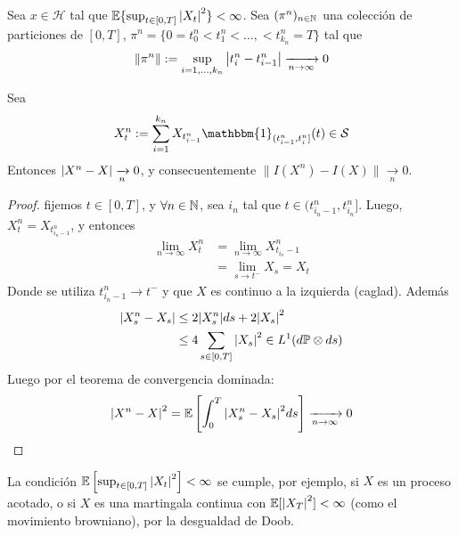 \begin{proposition}
        Sea $x \in \mathcal{H}$ tal que $\mathbb{E}\{ \sup_{t \in [0,T]} \abs{X_t}^2 \} < \infty$. Sea 
        $(\pi^n)_{n \in \mathbb{N}}$ una colección de particiones de $[0,T]$, $\pi^{n} = \{ 0= t_0^{n}< 
        t_{1}^n< \ldots, < t_{k_n}^{n} = T\}$ tal que 
        \begin{equation*}
                \|\pi^n\| := \sup_{i = 1, \ldots, k_n} \abs{t_i^n -
                t_{i-1}^{n}} \xrightarrow[n \to \infty]{} 0
        \end{equation*}

        Sea
        \begin{equation*}
                X_t^n := \sum_{i=1}^{k_n} X_{t_{i-1}^n} \mathbbm{1}_{(t_{i-1}^n, t_{i}^{n}]}(t) \in \mathcal{S}
        \end{equation*}
        Entonces $\abs{X^n - X} \xrightarrow[n]{} 0$, y consecuentemente
        $\|I(X^n) - I(X)\| \xrightarrow[n]{} 0$.
\end{proposition}
\begin{proof}
\gris
    fijemos $t \in [0,T]$, y $\forall n \in \mathbb{N}$, sea $i_n$ tal que $t \in (t_{i_n -1}^n, t_{i_n}^n]$. 
    Luego, $X_{t}^{n} = X_{t_{i_n -1}^n}$, y entonces 
    \begin{align*}
            \lim_{n \to \infty} X_{t}^{n} 
            &= \lim_{n \to \infty} X_{t_{i_n} - 1}^n \\
            &= \lim_{s \to t^{-}} X_s = X_t 
    \end{align*}
    Donde se utiliza $t_{i_n - 1}^n \to t^{-}$ y que $X$ es continuo a la izquierda (caglad). Además 
    \begin{align*}
            \abs{X^n_s - X_s} 
            &\le 2 \abs{X_{s}^n} ds + 2 \abs{X_s}^2\\
            &\le 4 \sum_{s \in [0,T]} \abs{X_s}^2 \in L^{1}(d\mathbb{P} \otimes ds) 
    \end{align*}
    Luego por el teorema de convergencia dominada:
\begin{equation*}
    \abs{X^n - X}^2 = \mathbb{E}\left[ \int_{0}^{T} \abs{X_s^n - X_s}^2 ds \right]
    \xrightarrow[n \to \infty]{}  0
\end{equation*}
\findem
\negro
\end{proof}
\begin{remark}
    La condición $\mathbb{E} \left[ \sup_{t \in [0,T]} \abs{X_t}^2 \right] < \infty$ se cumple, por ejemplo, si $X$ es un proceso acotado, o si $X$ es una martingala continua con $\mathbb{E} [\abs{X_T}^2] < \infty$ (como el movimiento browniano), por la desgualdad de Doob.
\end{remark}

